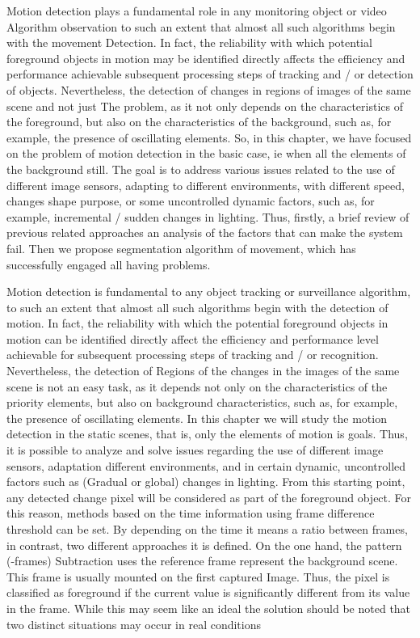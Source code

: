 Motion detection plays a fundamental role in any monitoring object or video Algorithm observation to such an extent that almost all such algorithms begin with the movement Detection. In fact, the reliability with which potential foreground objects in motion may be identified directly affects the efficiency and performance achievable subsequent processing steps of tracking and / or detection of objects. Nevertheless, the detection of changes in regions of images of the same scene and not just The problem, as it not only depends on the characteristics of the foreground, but also on the characteristics of the background, such as, for example, the presence of oscillating elements. So, in this chapter, we have focused on the problem of motion detection in the basic case, ie when all the elements of the background still. The goal is to address various issues related to the use of different image sensors, adapting to different environments, with different speed, changes shape purpose, or some uncontrolled dynamic factors, such as, for example, incremental / sudden changes in lighting. Thus, firstly, a brief review of previous related approaches an analysis of the factors that can make the system fail. Then we propose segmentation algorithm of movement, which has successfully engaged all having problems. \cite{Dzung}

Motion detection is fundamental to any object tracking or surveillance algorithm, to such an extent that almost all such algorithms begin with the detection of motion. In fact, the reliability with which the potential foreground objects in motion can be identified directly affect the efficiency and performance level achievable for subsequent processing steps of tracking and / or recognition. Nevertheless, the detection of Regions of the changes in the images of the same scene is not an easy task, as it depends not only on the characteristics of the priority elements, but also on background characteristics, such as, for example, the presence of oscillating elements.\cite{Chen} In this chapter we will study the motion detection in the static scenes, that is, only the elements of motion is goals. Thus, it is possible to analyze and solve issues regarding the use of different image sensors, adaptation different environments, and in certain dynamic, uncontrolled factors such as (Gradual or global) changes in lighting. From this starting point, any detected change pixel will be considered as part of the foreground object. For this reason, methods based on the time information using frame difference threshold can be set. By depending on the time it means a ratio between frames, in contrast, two different approaches it is defined. On the one hand, the pattern (-frames) Subtraction uses the reference frame represent the background scene. This frame is usually mounted on the first captured Image. Thus, the pixel is classified as foreground if the current value is significantly different from its value in the frame. While this may seem like an ideal the solution should be noted that two distinct situations may occur in real conditions 

